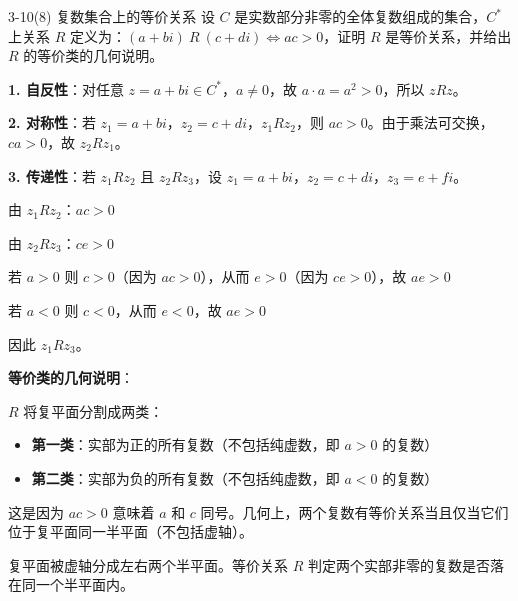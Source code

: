 \documentclass[11pt]{article}
\begin{document}
\begin{question}{3-10(8) 复数集合上的等价关系}
  设 $C$ 是实数部分非零的全体复数组成的集合，$C^*$ 上关系 $R$ 定义为：$(a+bi)\ R\ (c+di) \Leftrightarrow ac > 0$，证明 $R$ 是等价关系，并给出 $R$ 的等价类的几何说明。

  \begin{answer}
    \vspace{1em}
    \noindent\textbf{1. 自反性}：对任意 $z = a+bi \in C^*$，$a \neq 0$，故 $a \cdot a = a^2 > 0$，所以 $zRz$。

    \vspace{1em}
    \noindent\textbf{2. 对称性}：若 $z_1 = a+bi$，$z_2 = c+di$，$z_1Rz_2$，则 $ac > 0$。由于乘法可交换，$ca > 0$，故 $z_2Rz_1$。

    \vspace{1em}
    \noindent\textbf{3. 传递性}：若 $z_1Rz_2$ 且 $z_2Rz_3$，设 $z_1 = a+bi$，$z_2 = c+di$，$z_3 = e+fi$。

    由 $z_1Rz_2$：$ac > 0$

    由 $z_2Rz_3$：$ce > 0$

    若 $a > 0$ 则 $c > 0$（因为 $ac > 0$），从而 $e > 0$（因为 $ce > 0$），故 $ae > 0$

    若 $a < 0$ 则 $c < 0$，从而 $e < 0$，故 $ae > 0$

    因此 $z_1Rz_3$。

    \vspace{1em}
    \noindent\textbf{等价类的几何说明}：

    $R$ 将复平面分割成两类：
    \begin{itemize}
      \item \textbf{第一类}：实部为正的所有复数（不包括纯虚数，即 $a > 0$ 的复数）
      \item \textbf{第二类}：实部为负的所有复数（不包括纯虚数，即 $a < 0$ 的复数）
    \end{itemize}

    这是因为 $ac > 0$ 意味着 $a$ 和 $c$ 同号。几何上，两个复数有等价关系当且仅当它们位于复平面同一半平面（不包括虚轴）。

    \begin{info}[几何意义:]
      复平面被虚轴分成左右两个半平面。等价关系 $R$ 判定两个实部非零的复数是否落在同一个半平面内。
    \end{info}
  \end{answer}
\end{question}
\end{document}
